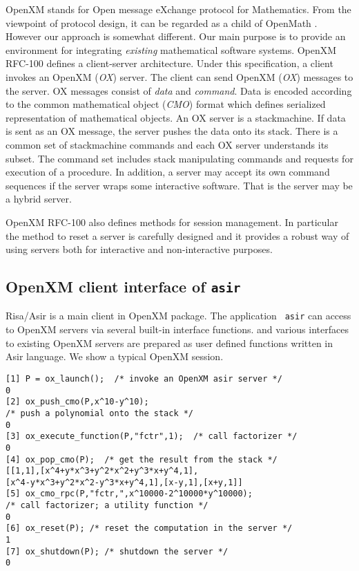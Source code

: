 \documentclass[runningheads]{cl2emult}
\begin{document}
OpenXM stands for Open message eXchange protocol for Mathematics.
From the viewpoint of protocol design, it can be regarded as a child
of OpenMath \cite{OPENMATH}.  However our approach is somewhat
different. Our main purpose is to provide an environment for
integrating {\it existing} mathematical software systems. OpenXM
RFC-100 \cite{RFC100} defines a client-server architecture.  Under
this specification, a client invokes an OpenXM ({\it OX}) server.  The
client can send OpenXM ({\it OX}) messages to the server.  OX messages
consist of {\it data} and {\it command}. Data is encoded according to
the common mathematical object ({\it CMO}) format which defines
serialized representation of mathematical objects.  An OX server is a
stackmachine. If data is sent as an OX message, the server pushes the
data onto its stack. There is a common set of stackmachine commands
and each OX server understands its subset. The command set includes
stack manipulating commands and requests for execution of a procedure. 
In addition, a server may accept its own command sequences if the
server wraps some interactive software. That is the server may be a
hybrid server.

OpenXM RFC-100 also defines methods for session management. In particular
the method to reset a server is carefully designed and it provides
a robust way of using servers both for interactive and non-interactive
purposes.

\subsection{OpenXM client interface of {\tt asir}}

Risa/Asir is a main client in OpenXM package.  The application {\tt
asir} can access to OpenXM servers via several built-in interface
functions. and various interfaces to existing OpenXM servers are
prepared as user defined functions written in Asir language. 
We show a typical OpenXM session.

\begin{verbatim}
[1] P = ox_launch();  /* invoke an OpenXM asir server */
0
[2] ox_push_cmo(P,x^10-y^10);
/* push a polynomial onto the stack */
0
[3] ox_execute_function(P,"fctr",1);  /* call factorizer */
0
[4] ox_pop_cmo(P);  /* get the result from the stack */
[[1,1],[x^4+y*x^3+y^2*x^2+y^3*x+y^4,1],
[x^4-y*x^3+y^2*x^2-y^3*x+y^4,1],[x-y,1],[x+y,1]]
[5] ox_cmo_rpc(P,"fctr,",x^10000-2^10000*y^10000); 
/* call factorizer; a utility function */
0
[6] ox_reset(P); /* reset the computation in the server */
1
[7] ox_shutdown(P); /* shutdown the server */
0
\end{verbatim}
\end{document}

